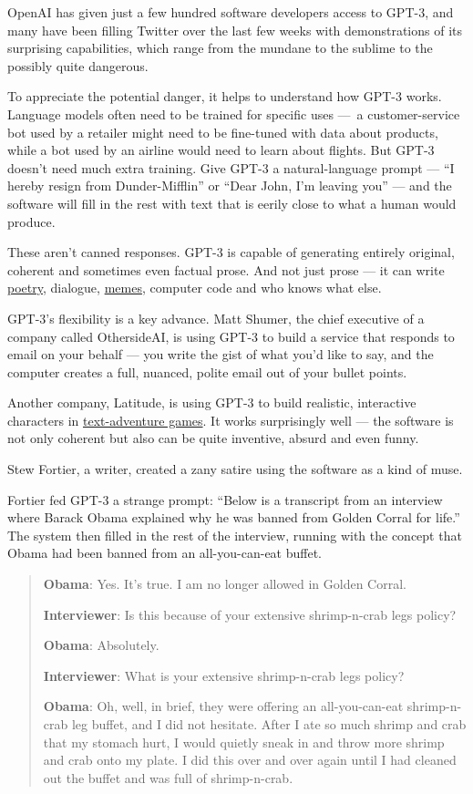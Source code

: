 OpenAI has given just a few hundred software developers access to GPT-3,
and many have been filling Twitter over the last few weeks with
demonstrations of its surprising capabilities, which range from the
mundane to the sublime to the possibly quite dangerous.

To appreciate the potential danger, it helps to understand how GPT-3
works. Language models often need to be trained for specific uses ---~a
customer-service bot used by a retailer might need to be fine-tuned with
data about products, while a bot used by an airline would need to learn
about flights. But GPT-3 doesn't need much extra training. Give GPT-3 a
natural-language prompt --- ``I hereby resign from Dunder-Mifflin'' or
``Dear John, I'm leaving you'' --- and the software will fill in the
rest with text that is eerily close to what a human would produce.

These aren't canned responses. GPT-3 is capable of generating entirely
original, coherent and sometimes even factual prose. And not just prose
--- it can write \href{https://www.gwern.net/GPT-3\#poetry}{poetry},
dialogue,
\href{https://aiweirdness.com/post/624445709546029056/choose-your-quarantine-house}{memes},
computer code and who knows what else.

GPT-3's flexibility is a key advance. Matt Shumer, the chief executive
of a company called OthersideAI, is using GPT-3 to build a service that
responds to email on your behalf --- you write the gist of what you'd
like to say, and the computer creates a full, nuanced, polite email out
of your bullet points.

Another company, Latitude, is using GPT-3 to build realistic,
interactive characters in
\href{https://play.aidungeon.io}{text-adventure games}. It works
surprisingly well --- the software is not only coherent but also can be
quite inventive, absurd and even funny.

Stew Fortier, a writer, created a zany satire using the software as a
kind of muse.

Fortier fed GPT-3 a strange prompt: ``Below is a transcript from an
interview where Barack Obama explained why he was banned from Golden
Corral for life.'' The system then filled in the rest of the interview,
running with the concept that Obama had been banned from an
all-you-can-eat buffet.

\begin{quote}
\textbf{Obama}: Yes. It's true. I am no longer allowed in Golden Corral.

\textbf{Interviewer}: Is this because of your extensive shrimp-n-crab
legs policy?

\textbf{Obama}: Absolutely.

\textbf{Interviewer}: What is your extensive shrimp-n-crab legs policy?

\textbf{Obama}: Oh, well, in brief, they were offering an
all-you-can-eat shrimp-n-crab leg buffet, and I did not hesitate. After
I ate so much shrimp and crab that my stomach hurt, I would quietly
sneak in and throw more shrimp and crab onto my plate. I did this over
and over again until I had cleaned out the buffet and was full of
shrimp-n-crab.
\end{quote}

